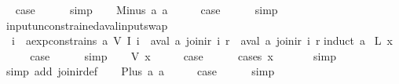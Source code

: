 \begin{isabellebody}
\ \isamarkupfalse%
\ {\isacharquery}case\isanewline
\ \ \ \ \isamarkupfalse%
\ simp\isanewline
{}\isamarkupfalse%
\isanewline
\ \ \isamarkupfalse%
\ {\isacharparenleft}Minus\ a{}\ a{}{\isacharparenright}\isanewline
\ \ \isamarkupfalse%
\ \isamarkupfalse%
\ {\isacharquery}case\isanewline
\ \ \ \ \isamarkupfalse%
\ simp\isanewline
{}\isamarkupfalse%
%
\endisatagproof
{\isafoldproof}%
%
\isadelimproof
\isanewline
%
\endisadelimproof
\isanewline
{}\isamarkupfalse%
\ input{\isacharunderscore}unconstrained{\isacharunderscore}aval{\isacharunderscore}input{\isacharunderscore}swap{\isacharcolon}\isanewline
\ \ {\isachardoublequoteopen}{\isasymforall}i{\isachardot}\ {\isasymnot}\ aexp{\isacharunderscore}constrains\ a\ {\isacharparenleft}V\ {\isacharparenleft}I\ i{\isacharparenright}{\isacharparenright}\ {\isasymLongrightarrow}\ aval\ a\ {\isacharparenleft}join{\isacharunderscore}ir\ i\ r{\isacharparenright}\ {\isacharequal}\ aval\ a\ {\isacharparenleft}join{\isacharunderscore}ir\ i{\isacharprime}\ r{\isacharparenright}{\isachardoublequoteclose}\isanewline
%
\isadelimproof
%
\endisadelimproof
%
\isatagproof
{}\isamarkupfalse%
{\isacharparenleft}induct\ a{\isacharparenright}\isanewline
{}\isamarkupfalse%
\ {\isacharparenleft}L\ x{\isacharparenright}\isanewline
\ \ \isamarkupfalse%
\ \isamarkupfalse%
\ {\isacharquery}case\isanewline
\ \ \ \ \isamarkupfalse%
\ simp\isanewline
{}\isamarkupfalse%
\isanewline
\ \ \isamarkupfalse%
\ {\isacharparenleft}V\ x{\isacharparenright}\isanewline
\ \ \isamarkupfalse%
\ \isamarkupfalse%
\ {\isacharquery}case\isanewline
\ \ \ \ \isamarkupfalse%
\ {\isacharparenleft}cases\ x{\isacharparenright}\isanewline
\ \ \ \ \ \isamarkupfalse%
\ simp\isanewline
\ \ \ \ \isamarkupfalse%
\ {\isacharparenleft}simp\ add{\isacharcolon}\ join{\isacharunderscore}ir{\isacharunderscore}def{\isacharparenright}\isanewline
{}\isamarkupfalse%
\isanewline
\ \ \isamarkupfalse%
\ {\isacharparenleft}Plus\ a{}\ a{}{\isacharparenright}\isanewline
\ \ \isamarkupfalse%
\ \isamarkupfalse%
\ {\isacharquery}case\isanewline
\ \ \ \ \isamarkupfalse%
\ simp\isanewline
{}\isamarkupfalse%
\isanewline

\end{isabellebody}
